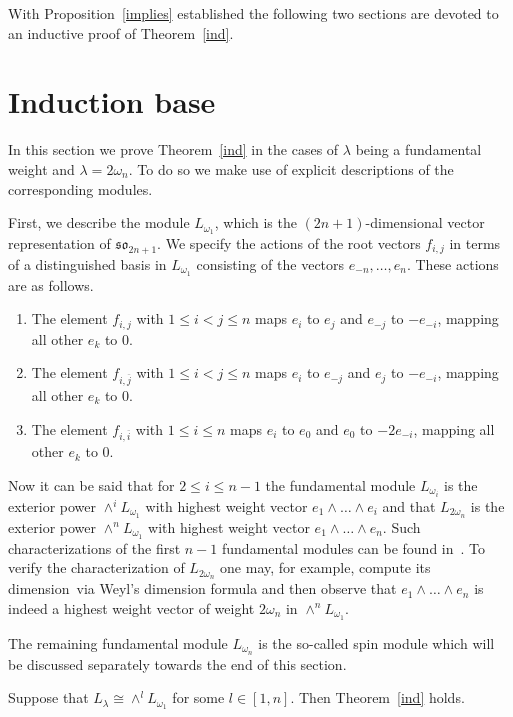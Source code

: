 \documentclass[ALCO,ThmDefs,Unicode]{cedram}
\newcommand{\la}{\lambda}
\begin{document}
With Proposition~\ref{implies} established the following two sections are devoted to an inductive proof of Theorem~\ref{ind}.


\section{Induction base}\label{basesec}

In this section we prove Theorem~\ref{ind} in the cases of $\la$ being a fundamental weight and $\la=2\omega_n$. To do so we make use of explicit descriptions of the corresponding modules.

First, we describe the module $L_{\omega_1}$, which is the $(2n+1)$-dimensional vector representation of $\mathfrak{so}_{2n+1}$. We specify the actions of the root vectors $f_{i,j}$ in terms of a distinguished basis in $L_{\omega_1}$ consisting of the vectors $e_{-n},\dots,e_n$. These actions are as follows.
\begin{enumerate}[label=(\roman*)]
\item\label{sec4_i} The element $f_{i,j}$ with $1\le i<j\le n$ maps $e_i$ to $e_j$ and $e_{-j}$ to $-e_{-i}$, mapping all other $e_k$ to 0.
\item\label{sec4_ii} The element $f_{i,\overline j}$ with $1\le i<j\le n$ maps $e_i$ to $e_{-j}$ and $e_j$ to $-e_{-i}$, mapping all other $e_k$ to 0.
\item\label{sec4_iii} The element $f_{i,\overline i}$ with $1\le i\le n$ maps $e_i$ to $e_0$ and $e_0$ to $-2e_{-i}$, mapping all other $e_k$ to 0.
\end{enumerate}

Now it can be said that for $2\le i\le n-1$ the fundamental module $L_{\omega_i}$ is the exterior power $\wedge^i L_{\omega_1}$ with highest weight vector $e_1\wedge\dots\wedge e_i$ and that $L_{2\omega_n}$ is the exterior power $\wedge^n L_{\omega_1}$ with highest weight vector $e_1\wedge\dots\wedge e_n$. Such characterizations of the first $n-1$ fundamental modules can be found in~\cite{carter}. To verify the characterization of $L_{2\omega_n}$ one may, for example, compute its dimension~via Weyl's dimension formula and then observe that $e_1\wedge\dots\wedge e_n$ is indeed a highest weight vector of weight $2\omega_n$ in $\wedge^n L_{\omega_1}$.

The remaining fundamental module $L_{\omega_n}$ is the so-called spin module which will be discussed separately towards the end of this section.

\begin{prop}\label{base}
Suppose that $L_\lambda\cong \wedge^l L_{\omega_1}$ for some $l\in [1,n]$. Then Theorem~\ref{ind} holds.
\end{prop}
\end{document}
